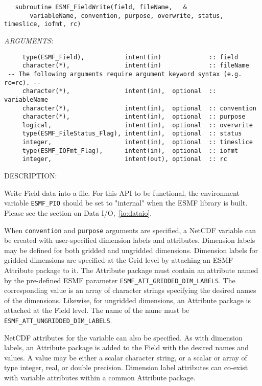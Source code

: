 \begin{verbatim}   subroutine ESMF_FieldWrite(field, fileName,   &
       variableName, convention, purpose, overwrite, status, timeslice, iofmt, rc)\end{verbatim}{\em ARGUMENTS:}
\begin{verbatim}     type(ESMF_Field),           intent(in)             :: field 
     character(*),               intent(in)             :: fileName
 -- The following arguments require argument keyword syntax (e.g. rc=rc). --
     character(*),               intent(in),  optional  :: variableName
     character(*),               intent(in),  optional  :: convention
     character(*),               intent(in),  optional  :: purpose
     logical,                    intent(in),  optional  :: overwrite
     type(ESMF_FileStatus_Flag), intent(in),  optional  :: status
     integer,                    intent(in),  optional  :: timeslice
     type(ESMF_IOFmt_Flag),      intent(in),  optional  :: iofmt
     integer,                    intent(out), optional  :: rc\end{verbatim}
{\sf DESCRIPTION:\\ }


     Write Field data into a file.  For this API to be functional, the 
     environment variable {\tt ESMF\_PIO} should be set to "internal" when 
     the ESMF library is built.  Please see the section on 
     Data I/O,~\ref{io:dataio}.
  
     When {\tt convention} and {\tt purpose} arguments are specified,
     a NetCDF variable can be created with user-specified dimension labels and
     attributes.  Dimension labels may be defined for both gridded and
     ungridded dimensions.  Dimension labels for gridded dimensions are specified
     at the Grid level by attaching an ESMF Attribute package to it.  The Attribute
     package must contain an attribute named by the pre-defined ESMF parameter
     {\tt ESMF\_ATT\_GRIDDED\_DIM\_LABELS}.  The corresponding value is an array of
     character strings specifying the desired names of the dimensions.  Likewise,
     for ungridded dimensions, an Attribute package is attached at the Field level.
     The name of the name must be {\tt ESMF\_ATT\_UNGRIDDED\_DIM\_LABELS}.
  
     NetCDF attributes for the variable can also be specified.  As with dimension labels,
     an Attribute package is added to the Field with the desired names and values.
     A value may be either a scalar character string, or a scalar or array of type
     integer, real, or double precision.  Dimension label attributes can co-exist with
     variable attributes within a common Attribute package.
  
